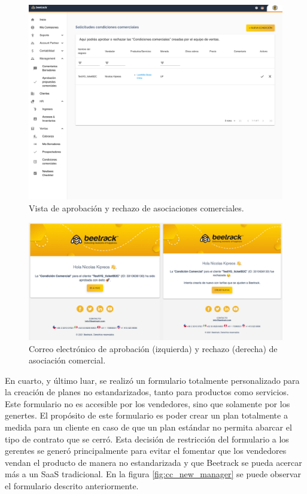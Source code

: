     \begin{figure}
      \centering
      \includegraphics[width=0.6\linewidth]{figures/cc/vistas/cc_review.png}
      \caption{Vista de aprobación y rechazo de asociaciones comerciales.}
      \label{fig:cc_review}
    \end{figure}

    \begin{figure}
      \centering
      \includegraphics[width=\linewidth]{figures/cc/mails/cc_approve_reject.jpeg}
      \caption{Correo electrónico de aprobación (izquierda) y rechazo (derecha) de asociación comercial.}
      \label{fig:cc_approve_reject}
    \end{figure}


    En cuarto, y último luar, se realizó un formulario totalmente personalizado para la creación de planes no estandarizados, tanto para productos como servicios. Este formulario no es accesible por los vendedores, sino que solamente por los genertes. El propósito de este formulario es poder crear un plan totalmente a medida para un cliente en caso de que un plan estándar no permita abarcar el tipo de contrato que se cerró. Esta decisión de restricción del formulario a los gerentes se generó principalmente para evitar el fomentar que los vendedores vendan el producto de manera no estandarizada y que Beetrack se pueda acercar más a un SaaS tradicional. En la figura \ref{fig:cc_new_manager} se puede observar el formulario descrito anteriormente.
 
